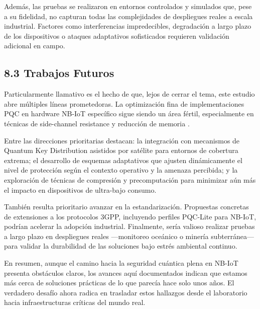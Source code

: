 Además, las pruebas se realizaron en entornos controlados y simulados que, pese a su fidelidad, no capturan todas las complejidades de despliegues reales a escala industrial. Factores como interferencias impredecibles, degradación a largo plazo de los dispositivos o ataques adaptativos sofisticados requieren validación adicional en campo.

\subsection{8.3 Trabajos Futuros}

Particularmente llamativo es el hecho de que, lejos de cerrar el tema, este estudio abre múltiples líneas prometedoras. La optimización fina de implementaciones PQC en hardware NB-IoT específico sigue siendo un área fértil, especialmente en técnicas de side-channel resistance y reducción de memoria \cite{Liu2024_PQC_IoT}.

Entre las direcciones prioritarias destacan: la integración con mecanismos de Quantum Key Distribution asistidos por satélite para entornos de cobertura extrema; el desarrollo de esquemas adaptativos que ajusten dinámicamente el nivel de protección según el contexto operativo y la amenaza percibida; y la exploración de técnicas de compresión y precomputación para minimizar aún más el impacto en dispositivos de ultra-bajo consumo.

También resulta prioritario avanzar en la estandarización. Propuestas concretas de extensiones a los protocolos 3GPP, incluyendo perfiles PQC-Lite para NB-IoT, podrían acelerar la adopción industrial. Finalmente, sería valioso realizar pruebas a largo plazo en despliegues reales —monitoreo oceánico o minería subterránea— para validar la durabilidad de las soluciones bajo estrés ambiental continuo.

En resumen, aunque el camino hacia la seguridad cuántica plena en NB-IoT presenta obstáculos claros, los avances aquí documentados indican que estamos más cerca de soluciones prácticas de lo que parecía hace solo unos años. El verdadero desafío ahora radica en trasladar estos hallazgos desde el laboratorio hacia infraestructuras críticas del mundo real.